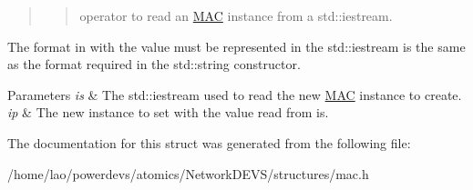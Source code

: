 \begin{quote}
\begin{quote}
operator to read an \hyperlink{structMAC}{M\+AC} instance from a std\+::iestream. \end{quote}
\end{quote}


The format in with the value must be represented in the std\+::iestream is the same as the format required in the std\+::string constructor.


\begin{DoxyParams}{Parameters}
{\em is} & The std\+::iestream used to read the new \hyperlink{structMAC}{M\+AC} instance to create. \\
\hline
{\em ip} & The new instance to set with the value read from is. \\
\hline
\end{DoxyParams}


The documentation for this struct was generated from the following file\+:\begin{DoxyCompactItemize}
\item 
/home/lao/powerdevs/atomics/\+Network\+D\+E\+V\+S/structures/mac.\+h\end{DoxyCompactItemize}
